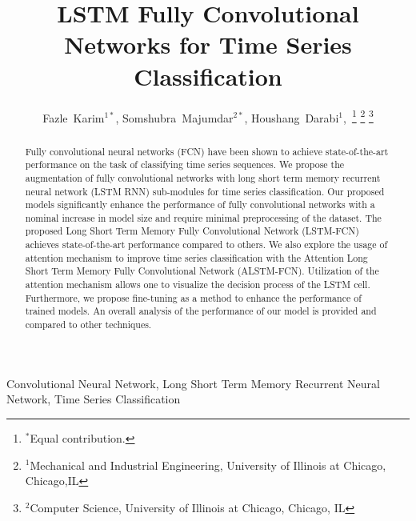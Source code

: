 \documentclass[article]{IEEEtran}
\begin{document}
\title{LSTM Fully Convolutional Networks for Time Series Classification}
\makeatletter
\let\@fnsymbol\@arabic
\makeatother

\author{Fazle~Karim$^{1 *}$,
        Somshubra~Majumdar$^{2 *}$,
        Houshang~Darabi$^{1}$,~\thanks{$^{*}$Equal contribution.}
\thanks{$^{1}$Mechanical and Industrial Engineering, University of Illinois at Chicago, Chicago,IL}
\thanks{$^{2}$Computer Science, University of Illinois at Chicago, Chicago, IL}}
















\maketitle


\begin{abstract}
Fully convolutional neural networks (FCN) have been shown to achieve state-of-the-art performance on the task of classifying time series sequences. We propose the augmentation of fully convolutional networks with long short term memory recurrent neural network (LSTM RNN) sub-modules for time series classification. Our proposed models significantly enhance the performance of fully convolutional networks with a nominal increase in model size and require minimal preprocessing of the dataset. The proposed Long Short Term Memory Fully Convolutional Network (LSTM-FCN) achieves state-of-the-art performance compared to others. We also explore the usage of attention mechanism to improve time series classification with the Attention Long Short Term Memory Fully Convolutional Network (ALSTM-FCN).  Utilization of the attention mechanism allows one to visualize the decision process of the LSTM cell. Furthermore, we propose fine-tuning as a method to enhance the performance of trained models. An  overall  analysis  of  the  performance  of  our  model  is  provided  and  compared  to  other techniques. \end{abstract}


\begin{IEEEkeywords}
 Convolutional Neural Network, Long Short Term Memory Recurrent Neural Network, Time Series Classification
\end{IEEEkeywords}
\end{document}
